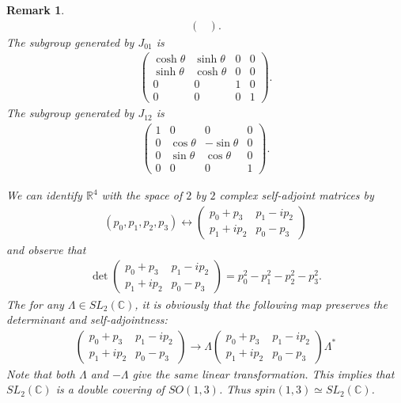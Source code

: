 \documentclass[a4paper,10pt]{amsart}
\newtheorem{remark}{Remark}[section]
\newcommand{\C}{\mathbb C} %
\newcommand{\R}{\mathbb R}  %
\begin{document}
\begin{remark}
\begin{align*}
\begin{pmatrix}
       \end{pmatrix}.
   \end{align*}
   The subgroup generated by $J_{01}$ is 
   \begin{align*}
      \begin{pmatrix}
          \cosh \theta & \sinh \theta & 0 & 0\\
          \sinh \theta & \cosh \theta & 0 & 0\\
          0 & 0 & 1 & 0\\
          0 & 0 & 0 & 1
      \end{pmatrix}.
   \end{align*}
   The subgroup generated by $J_{12}$ is 
   \begin{align*}
      \begin{pmatrix}
          1 & 0 & 0 & 0\\
          0 & \cos \theta & -\sin \theta & 0\\
          0 & \sin \theta & \cos \theta & 0 \\
          0 & 0 & 0 & 1
      \end{pmatrix}.
   \end{align*}

   We can identify $\R^4$ with the space of $2$ by $2$ complex self-adjoint
   matrices by
   \begin{align*}
       (p_0, p_1, p_2, p_3) \leftrightarrow 
       \begin{pmatrix}
           p_0 + p_3 & p_1 - ip_2\\
           p_1 + ip_2 & p_0 -p_3
       \end{pmatrix}
   \end{align*}
   and observe that
   \begin{align*}
       \det \begin{pmatrix}
           p_0 + p_3 & p_1 - ip_2\\
           p_1 + ip_2 & p_0 -p_3
       \end{pmatrix}  = p_{0}^2 - p_{1}^2 - p_{2}^2 - p_{3}^{2}.
   \end{align*}
   The for any $\Lambda \in SL_{2}(\C)$, it is obviously that
   the following map preserves the determinant and self-adjointness:
   \begin{align*}
       \begin{pmatrix}
           p_0 + p_3 & p_1 - ip_2\\
           p_1 + ip_2 & p_0 -p_3
       \end{pmatrix}
       \to
        \Lambda
        \begin{pmatrix}
           p_0 + p_3 & p_1 - ip_2\\
           p_1 + ip_2 & p_0 -p_3
        \end{pmatrix} \Lambda^{*}
   \end{align*}
   Note that both $\Lambda$ and $-\Lambda$ give the same linear 
   transformation. This implies that $SL_{2}(\C)$ is a double covering 
   of $SO(1,3)$. Thus $spin(1,3) \simeq SL_2(\C)$. 
\end{remark}
\end{document}
